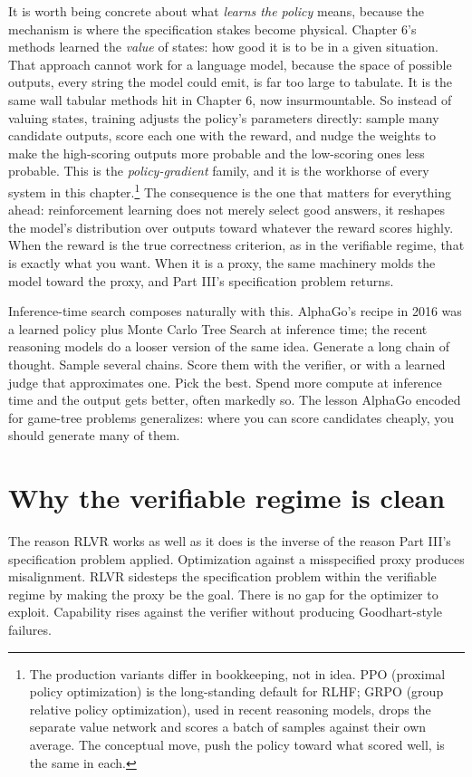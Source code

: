 It is worth being concrete about what \emph{learns the policy} means, because the mechanism is where the specification stakes become physical. Chapter 6's methods learned the \emph{value} of states: how good it is to be in a given situation. That approach cannot work for a language model, because the space of possible outputs, every string the model could emit, is far too large to tabulate. It is the same wall tabular methods hit in Chapter 6, now insurmountable. So instead of valuing states, training adjusts the policy's parameters directly: sample many candidate outputs, score each one with the reward, and nudge the weights to make the high-scoring outputs more probable and the low-scoring ones less probable. This is the \emph{policy-gradient} family, and it is the workhorse of every system in this chapter.\footnote{The production variants differ in bookkeeping, not in idea. PPO (proximal policy optimization) is the long-standing default for RLHF; GRPO (group relative policy optimization), used in recent reasoning models, drops the separate value network and scores a batch of samples against their own average. The conceptual move, push the policy toward what scored well, is the same in each.} The consequence is the one that matters for everything ahead: reinforcement learning does not merely select good answers, it reshapes the model's distribution over outputs toward whatever the reward scores highly. When the reward is the true correctness criterion, as in the verifiable regime, that is exactly what you want. When it is a proxy, the same machinery molds the model toward the proxy, and Part III's specification problem returns.

Inference-time search composes naturally with this. AlphaGo's recipe in 2016 was a learned policy plus Monte Carlo Tree Search at inference time; the recent reasoning models do a looser version of the same idea. Generate a long chain of thought. Sample several chains. Score them with the verifier, or with a learned judge that approximates one. Pick the best. Spend more compute at inference time and the output gets better, often markedly so. The lesson AlphaGo encoded for game-tree problems generalizes: where you can score candidates cheaply, you should generate many of them.

\section*{Why the verifiable regime is clean}

The reason RLVR works as well as it does is the inverse of the reason Part III's specification problem applied. Optimization against a misspecified proxy produces misalignment. RLVR sidesteps the specification problem within the verifiable regime by making the proxy be the goal. There is no gap for the optimizer to exploit. Capability rises against the verifier without producing Goodhart-style failures.

